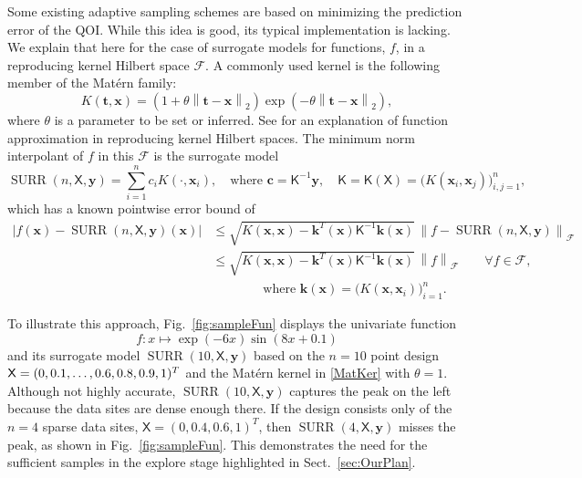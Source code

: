 \documentclass[11pt]{NSFamsart}
\DeclareMathOperator{\SURR}{SURR}
\newcommand{\mK}{\mathsf{K}}
\newcommand{\mX}{\mathsf{X}}
\newcommand{\bc}{{\boldsymbol{c}}}
\newcommand{\bx}{{\boldsymbol{x}}}
\newcommand{\bk}{{\boldsymbol{k}}}
\newcommand{\by}{{\boldsymbol{y}}}
\newcommand{\bt}{{\boldsymbol{t}}}
\newcommand{\calf}{{\mathcal{F}}}
\def\abs#1{\ensuremath{\left \lvert #1 \right \rvert}}
\newcommand{\norm}[2][{}]{\ensuremath{\left \lVert #2 \right \rVert}_{#1}}
\begin{document}
Some existing adaptive sampling schemes are based on minimizing the prediction error of the QOI.  While this idea is good, its typical implementation is lacking.  We explain that here for the case of surrogate models for functions, $f$, in a reproducing kernel Hilbert space $\calf$.  A commonly used kernel is the following member of the Mat\'ern family:
\begin{equation} \label{MatKer}
    K(\bt,\bx) = (1 + \theta \norm[2]{\bt-\bx}) \exp(-\theta\norm[2]{\bt-\bx}),
\end{equation}
where $\theta$ is a parameter to be set or inferred.  See \cite{Buh00, Fas07a, FasMcC15a, ForFly15a, ForEtal09, SchWen06a, Wen05a} for an explanation of function approximation in reproducing kernel Hilbert spaces.  The minimum norm interpolant of $f$ in this $\calf$ is the surrogate model
\begin{equation} \label{appxExOne}
    \SURR(n,\mX,\by) = \sum_{i=1}^n c_i K(\cdot, \bx_i), \quad \text{where } \bc = \mK^{-1} \by, \quad \mK = \mK(\mX) = \bigl( K(\bx_i,\bx_j) \bigr)_{i,j=1}^n, 
\end{equation}
which has a known pointwise error bound of
\begin{align}
\label{RKHSErrBd}
    \abs{f(\bx) - \SURR(n,\mX,\by)(\bx)} & \le \sqrt{K(\bx,\bx) - \bk^T(\bx) \mK^{-1} \bk(\bx)} \, \norm[\calf]{f - \SURR(n,\mX,\by)} \\
    \nonumber
    & \le \sqrt{K(\bx,\bx) - \bk^T(\bx) \mK^{-1} \bk(\bx)} \, \norm[\calf]{f} \qquad \forall f \in \calf, \\
    \nonumber
    & \qquad \qquad \text{where }  \bk(\bx) = \bigl(K(\bx,\bx_i) \bigr)_{i=1}^n.
\end{align}

To illustrate this approach, Fig.\ \ref{fig:sampleFun} displays the univariate function 
\begin{equation} \label{eq:univarfun}
f \colon x \mapsto \exp(-6x) \sin(8x+0.1)
\end{equation}
and its surrogate model $\SURR(10,\mX,\by)$ based on the $n=10$ point design $\mX = (0, 0.1, \ldots, 0.6, 0.8,\linebreak 0.9, 1)^T$ and the Mat\'ern kernel in \eqref{MatKer} with $\theta =1$.  
Although not highly accurate, $\SURR(10,\mX,\by)$ captures the peak on the left because the data sites are dense enough there.  If the design consists only of the $n=4$ sparse data sites, $\mX = (0, 0.4,  0.6, 1)^T$, then $\SURR(4,\mX,\by)$ misses the peak, as shown in Fig.\ \ref{fig:sampleFun}. This demonstrates the need for the sufficient samples in the explore stage highlighted in Sect.\ \ref{sec:OurPlan}. 
\end{document}
